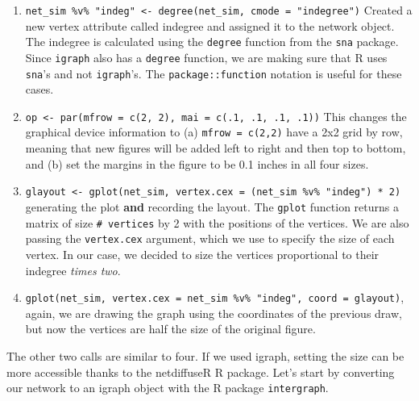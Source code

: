 \documentclass[
]{book}
\newenvironment{Shaded}{\begin{snugshade}}{\end{snugshade}}
\newcommand{\AttributeTok}[1]{\textcolor[rgb]{0.13,0.29,0.53}{#1}}
\newcommand{\CommentTok}[1]{\textcolor[rgb]{0.56,0.35,0.01}{\textit{#1}}}
\newcommand{\ConstantTok}[1]{\textcolor[rgb]{0.56,0.35,0.01}{#1}}
\newcommand{\DecValTok}[1]{\textcolor[rgb]{0.00,0.00,0.81}{#1}}
\newcommand{\FunctionTok}[1]{\textcolor[rgb]{0.13,0.29,0.53}{\textbf{#1}}}
\newcommand{\NormalTok}[1]{#1}
\newcommand{\OtherTok}[1]{\textcolor[rgb]{0.56,0.35,0.01}{#1}}
\newcommand{\SpecialCharTok}[1]{\textcolor[rgb]{0.81,0.36,0.00}{\textbf{#1}}}
\begin{document}
\begin{enumerate}
\def\labelenumi{\arabic{enumi}.}
\item
  \texttt{net\_sim\ \%v\%\ "indeg"\ \textless{}-\ degree(net\_sim,\ cmode\ =\ "indegree")} Created a new
  vertex attribute called indegree and assigned it to the network object.
  The indegree is calculated using the \texttt{degree} function from the \texttt{sna}
  package. Since \texttt{igraph} also has a \texttt{degree} function, we are making sure
  that R uses \texttt{sna}'s and not \texttt{igraph}'s. The \texttt{package::function} notation
  is useful for these cases.
\item
  \texttt{op\ \textless{}-\ par(mfrow\ =\ c(2,\ 2),\ mai\ =\ c(.1,\ .1,\ .1,\ .1))} This changes the
  graphical device information to (a) \texttt{mfrow\ =\ c(2,2)} have a 2x2 grid by row,
  meaning that new figures will be added left to right and then top to bottom,
  and (b) set the margins in the figure to be 0.1 inches in all four sizes.
\item
  \texttt{glayout\ \textless{}-\ gplot(net\_sim,\ vertex.cex\ =\ (net\_sim\ \%v\%\ "indeg")\ *\ 2)} generating
  the plot \textbf{and} recording the layout. The \texttt{gplot} function returns a matrix of
  size \texttt{\#\ vertices} by 2 with the positions of the vertices. We are also passing the
  \texttt{vertex.cex} argument, which we use to specify the size of each vertex. In our
  case, we decided to size the vertices proportional to their indegree \emph{times two}.
\item
  \texttt{gplot(net\_sim,\ vertex.cex\ =\ net\_sim\ \%v\%\ "indeg",\ coord\ =\ glayout)}, again,
  we are drawing the graph using the coordinates of the previous draw, but now
  the vertices are half the size of the original figure.
\end{enumerate}

The other two calls are similar to four. If we used igraph, setting the
size can be more accessible thanks to the netdiffuseR R package. Let's start by converting
our network to an igraph object with the R package \texttt{intergraph}.

\begin{Shaded}
\end{Shaded}
\end{document}
